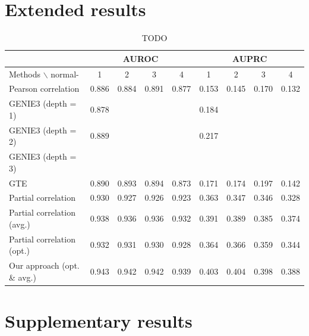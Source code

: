 \documentclass[wcp]{jmlr}
\begin{document}
\section{Extended results}

\begin{table}
\small
\centering
\begin{tabular}{@{}l *{8}{c}@{}}
  & \multicolumn{4}{c}{AUROC} & \multicolumn{4}{c}{AUPRC} \\
\hline \hline
Methods $\backslash$ normal- & 1 & 2 & 3 & 4 & 1 & 2 & 3 & 4 \\
\hline \hline
Pearson correlation    & 0.886 & 0.884 & 0.891 & 0.877 & 0.153 & 0.145 & 0.170 & 0.132 \\
GENIE3 (depth = 1)     & 0.878 & & & & 0.184 & & & \\
GENIE3 (depth = 2)     & 0.889 & & & & 0.217 & & & \\
GENIE3 (depth = 3)     & & & & & & & & \\
GTE                    & 0.890 & 0.893 & 0.894 & 0.873 & 0.171 & 0.174 & 0.197 & 0.142 \\
Partial correlation    & 0.930 &  0.927 &  0.926 &  0.923& 0.363  & 0.347 &  0.346 & 0.328 \\
Partial correlation (avg.) & 0.938 & 0.936 & 0.936 & 0.932& 0.391 & 0.389 & 0.385 & 0.374\\
Partial correlation (opt.) & 0.932 & 0.931 & 0.930 & 0.928 & 0.364 & 0.366 & 0.359 & 0.344 \\
Our approach (opt. \& avg.)    & 0.943 & 0.942 & 0.942 & 0.939 & 0.403 & 0.404 & 0.398 & 0.388 \\
\end{tabular}
\caption{TODO}
\label{tab:tab1}
\end{table}


\section{Supplementary results}
\end{document}
